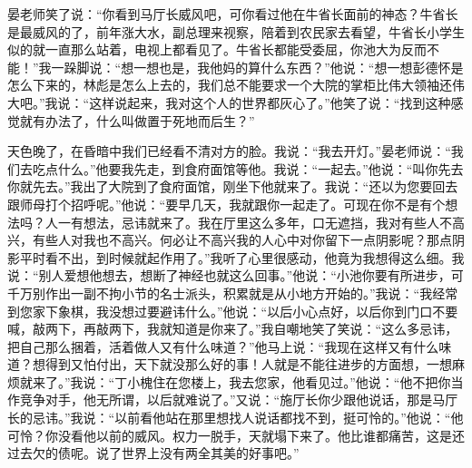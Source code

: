 \documentclass[12pt,oneside]{book}
\begin{document}
晏老师笑了说：``你看到马厅长威风吧，可你看过他在牛省长面前的神态？牛省长是最威风的了，前年涨大水，副总理来视察，陪着到农民家去看望，牛省长小学生似的就一直那么站着，电视上都看见了。牛省长都能受委屈，你池大为反而不能！''我一跺脚说：``想一想也是，我他妈的算什么东西？''他说：``想一想彭德怀是怎么下来的，林彪是怎么上去的，我们总不能要求一个大院的掌柜比伟大领袖还伟大吧。''我说：``这样说起来，我对这个人的世界都灰心了。''他笑了说：``找到这种感觉就有办法了，什么叫做置于死地而后生？''

天色晚了，在昏暗中我们已经看不清对方的脸。我说：``我去开灯。''晏老师说：``我们去吃点什么。''他要我先走，到食府面馆等他。我说：``一起去。''他说：``叫你先去你就先去。''我出了大院到了食府面馆，刚坐下他就来了。我说：``还以为您要回去跟师母打个招呼呢。''他说：``要早几天，我就跟你一起走了。可现在你不是有个想法吗？人一有想法，忌讳就来了。我在厅里这么多年，口无遮挡，我对有些人不高兴，有些人对我也不高兴。何必让不高兴我的人心中对你留下一点阴影呢？那点阴影平时看不出，到时候就起作用了。''我听了心里很感动，他竟为我想得这么细。我说：``别人爱想他想去，想断了神经也就这么回事。''他说：``小池你要有所进步，可千万别作出一副不拘小节的名士派头，积累就是从小地方开始的。''我说：``我经常到您家下象棋，我没想过要避讳什么。''他说：``以后小心点好，以后你到门口不要喊，敲两下，再敲两下，我就知道是你来了。''我自嘲地笑了笑说：``这么多忌讳，把自己那么捆着，活着做人又有什么味道？''他马上说：``我现在这样又有什么味道？想得到又怕付出，天下就没那么好的事！人就是不能往进步的方面想，一想麻烦就来了。''我说：``丁小槐住在您楼上，我去您家，他看见过。''他说：``他不把你当作竞争对手，他无所谓，以后就难说了。''又说：``施厅长你少跟他说话，那是马厅长的忌讳。''我说：``以前看他站在那里想找人说话都找不到，挺可怜的。''他说：``他可怜？你没看他以前的威风。权力一脱手，天就塌下来了。他比谁都痛苦，这是还过去欠的债呢。说了世界上没有两全其美的好事吧。''
\end{document}
